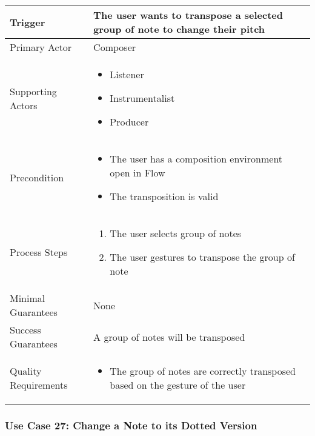 \begin{tabularx}{\textwidth}{|X|X|}
\hline
Trigger & 
The user wants to transpose a selected group of note to change their pitch \\
\hline
Primary Actor & 
Composer \\
\hline
Supporting Actors & 
\begin{itemize}
\item Listener
\item Instrumentalist
\item Producer
\end{itemize} \\
\hline
Precondition & 
\begin{itemize}
\item The user has a composition environment open in Flow
\item The transposition is valid
\end{itemize} \\
\hline
Process Steps & 
\begin{enumerate}
\item The user selects group of notes
\item The user gestures to transpose the group of note
\end{enumerate} \\
\hline
Minimal Guarantees & 
None \\
\hline
Success Guarantees & 
A group of notes will be transposed \\
\hline
Quality Requirements & 
\begin{itemize}
\item The group of notes are correctly transposed based on the gesture of the user
\end{itemize} \\ 
\hline
\end{tabularx}

\subsubsection{Use Case 27: Change a Note to its Dotted Version}

